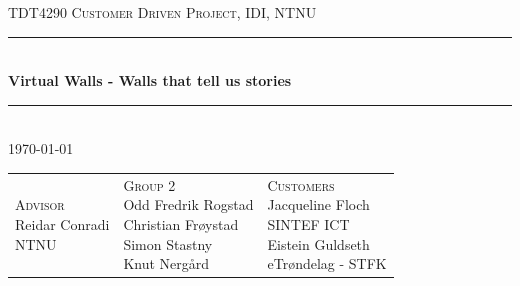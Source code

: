 \documentclass[11pt]{book}
\begin{document}
\newcommand{\fullprojectname}[0]{Virtual Walls - Walls that tell us stories}
\newcommand{\shortprojectname}[0]{Virtual Walls}
\newcommand{\systemname}[0]{StedR}
\newcommand{\wallentitys}[0]{place}
\newcommand{\wallentityp}[0]{places}
\newcommand{\wallentitypcap}[0]{Places}

\frontmatter

\begin{titlepage}
    \color{white}
    \begin{center}
        
        
        \textsc{\Large TDT4290 Customer Driven Project, IDI, NTNU}
        \\[0.5cm]
        
        \rule{\linewidth}{0.5mm}
        \\[1cm]
        
        \textbf{\LARGE \fullprojectname}
        \\[1cm]
        
        \rule{\linewidth}{0.5mm}
        \\[1.0cm]
        
        \Large{  \today}
        \\[1.5cm]

\begin{table}[H]
\centering
\begin{tabular}{ p{4cm} p{5cm} p{4cm} }
\parbox{4cm}{
\centering
    \color{white}
        \textsc{\Large Advisor}
        \\[0.1cm]
        \Large
        {
            Reidar Conradi\\
             \small{NTNU}
        }
} & \parbox{5cm}{
\centering
    \color{white}
        \textsc{\Large Group 2}
        \\[0.1cm]
        \Large
        {
            Odd Fredrik Rogstad \\
            Christian Frøystad \\
            Simon Stastny \\
            Knut Nergård
        }
} & \parbox{4cm}{
\centering
    \color{white}
        \textsc{\Large Customers}
        \\[0.1cm]
        \Large
        {
            Jacqueline Floch\\
            \small{SINTEF ICT}\\
            \Large{Eistein Guldseth}\\
            \small{eTrøndelag - STFK}\\
        }
}
\end{tabular}
\end{table}
        


\end{center}
\end{titlepage}
\end{document}
